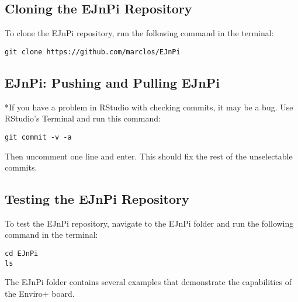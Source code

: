 \documentclass{article}
\begin{document}
\subsection{Cloning the EJnPi Repository}

To clone the EJnPi repository, run the following command in the terminal:

\begin{verbatim}
git clone https://github.com/marclos/EJnPi
\end{verbatim}


\subsection{EJnPi: Pushing and Pulling EJnPi}


*If you have a problem in RStudio with checking commits, it may be a bug. Use RStudio's Terminal and run this command:

\begin{verbatim}
git commit -v -a
\end{verbatim}

Then uncomment one line and enter. This should fix the rest of the unselectable commits.


\subsection{Testing the EJnPi Repository}

To test the EJnPi repository, navigate to the EJnPi folder and run the following command in the terminal:

\begin{verbatim}
cd EJnPi
ls
\end{verbatim}

The EJnPi folder contains several examples that demonstrate the capabilities of the Enviro+ board.
\end{document}
